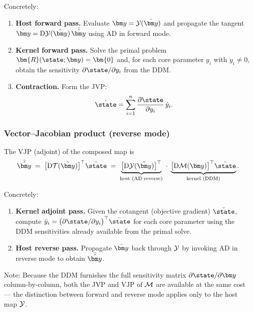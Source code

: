  Concretely:
  \begin{enumerate}
      \item \textbf{Host forward pass.}
            Evaluate $\corey = \Ymap(\haty)$ and propagate the
            tangent $\dot{\corey} = \mathrm{D}\Ymap(\haty)\,\dot{\haty}$
            using AD in forward mode.
      \item \textbf{Kernel forward pass.}
            Solve the primal problem $\bm{R}(\state;\corey)=\bm{0}$
            and, for each core parameter $y_i$ with
            $\dot{y}_i \neq 0$, obtain the sensitivity
            $\partial\state/\partial y_i$ from the DDM.
      \item \textbf{Contraction.}
            Form the JVP:
            \[
                \dot{\state}
                = \sum_{i=1}^{\ncore}
                  \frac{\partial\state}{\partial y_i}\,\dot{y}_i.
            \]
  \end{enumerate}

\subsubsection{Vector--Jacobian product (reverse mode)}

  The VJP (adjoint) of the composed map is
  \[
      \bar{\haty}
      \;=\;
      \bigl[\mathrm{D}\Tmap(\haty)\bigr]^\top \bar{\state}
      \;=\;
      \underbrace{%
          \bigl[\mathrm{D}\Ymap(\haty)\bigr]^\top
      }_{\text{host (AD reverse)}}
      \;\cdot\;
      \underbrace{%
          \bigl[\mathrm{D}\Mmap(\corey)\bigr]^\top \bar{\state}
      }_{\text{kernel (DDM)}}.
  \]

  Concretely:
  \begin{enumerate}
      \item \textbf{Kernel adjoint pass.}
            Given the cotangent (objective gradient) $\bar{\state}$,
            compute
            $\bar{y}_i
              = \bigl(\partial\state/\partial y_i\bigr)^\top
                \bar{\state}$
            for each core parameter using the DDM sensitivities
            already available from the primal solve.
      \item \textbf{Host reverse pass.}
            Propagate $\bar{\corey}$ back through $\mathcal{Y}$ by
            invoking AD in reverse mode to obtain $\bar{\haty}$.
  \end{enumerate}

  Note: Because the DDM furnishes the full sensitivity matrix
  $\partial\state/\partial\corey$ column-by-column, both the JVP
  and VJP of $\mathcal{M}$ are available at the same cost — the
  distinction between forward and reverse mode applies only to the
  host map $\mathcal{Y}$.

